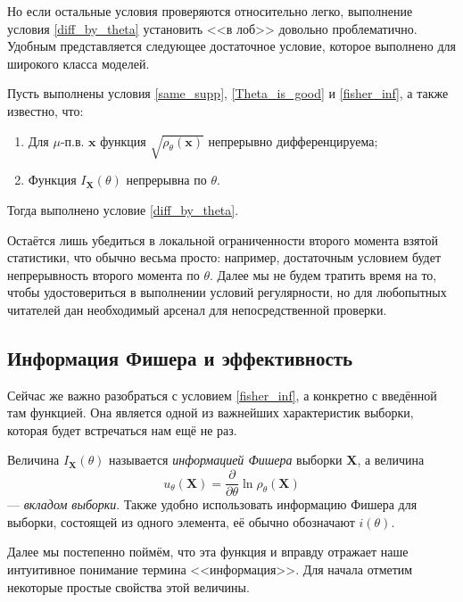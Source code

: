 Но если остальные условия проверяются относительно легко, выполнение условия \ref{diff_by_theta} установить <<в лоб>> довольно проблематично. Удобным представляется следующее достаточное условие, которое выполнено для широкого класса моделей.

\begin{theorem}{\cite[лемма 26.1]{borovkov}}{}
    Пусть выполнены условия \ref{same_supp}, \ref{Theta_is_good} и \ref{fisher_inf}, а также известно, что:
    \begin{enumerate}
        \item Для $\mu$-п.в. $\mathbf{x}$ функция $\sqrt{\rho_{\theta}(\mathbf{x})}$ непрерывно дифференцируема;
        \item Функция $I_{\mathbf X}(\theta)$ непрерывна по $\theta$.
    \end{enumerate}

    Тогда выполнено условие \ref{diff_by_theta}.
\end{theorem}

Остаётся лишь убедиться в локальной ограниченности второго момента взятой статистики, что обычно весьма просто: например, достаточным условием будет непрерывность второго момента по $\theta$. Далее мы не будем тратить время на то, чтобы удостовериться в выполнении условий регулярности, но для любопытных читателей дан необходимый арсенал для непосредственной проверки.

\subsection{Информация Фишера и эффективность}

Сейчас же важно разобраться с условием \ref{fisher_inf}, а конкретно с введённой там функцией. Она является одной из важнейших характеристик выборки, которая будет встречаться нам ещё не раз.

\begin{definition}
    Величина $I_{\mathbf X}(\theta)$ называется \textit{информацией Фишера} выборки $\mathbf X$, а величина 
    \[
    u_{\theta}(\mathbf X) = \frac{\partial}{\partial\theta}\ln{\rho_{\theta}(\mathbf X)}
    \]
    --- \textit{вкладом выборки}. Также удобно использовать информацию Фишера для выборки, состоящей из одного элемента, её обычно обозначают $i(\theta)$.
\end{definition}

Далее мы постепенно поймём, что эта функция и вправду отражает наше интуитивное понимание термина <<информация>>. Для начала отметим некоторые простые свойства этой величины.

